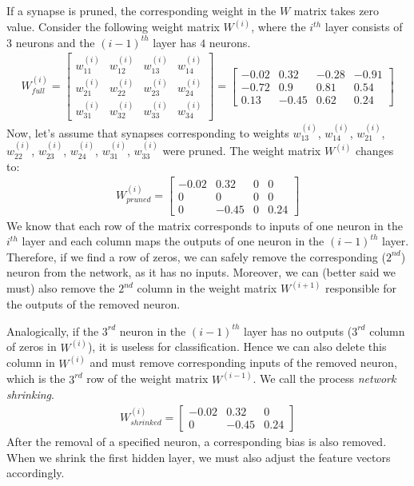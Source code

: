If a synapse is pruned, the corresponding weight in the $ W $ matrix takes zero value. Consider the following weight matrix $ W^{(i)} $, where the $ i^{th} $ layer consists of $ 3 $ neurons and the $ (i-1)^{th} $ layer has $ 4 $ neurons.
\begin{align*}
W_{full}^{(i)} = 
\begin{bmatrix}
    w_{11}^{(i)} & w_{12}^{(i)} & w_{13}^{(i)} & w_{14}^{(i)} \\
    w_{21}^{(i)} & w_{22}^{(i)} & w_{23}^{(i)} & w_{24}^{(i)} \\
    w_{31}^{(i)} & w_{32}^{(i)} & w_{33}^{(i)} & w_{34}^{(i)}
\end{bmatrix}
=
\begin{bmatrix}
    -0.02 & 0.32 & -0.28 & -0.91 \\
    -0.72 & 0.9 & 0.81 & 0.54 \\
    0.13 & -0.45 & 0.62 & 0.24
\end{bmatrix}
\end{align*}
Now, let's assume that synapses corresponding to weights $ w_{13}^{(i)} $, $ w_{14}^{(i)} $, $ w_{21}^{(i)} $, $ w_{22}^{(i)} $, $ w_{23}^{(i)} $, $ w_{24}^{(i)} $, $ w_{31}^{(i)} $, $ w_{33}^{(i)} $ were pruned. The weight matrix $ W^{(i)} $ changes to:
\begin{align*}
W_{pruned}^{(i)} = 
\begin{bmatrix}
    -0.02 & 0.32 & 0 & 0 \\
    0 & 0 & 0 & 0 \\
    0 & -0.45 & 0 & 0.24
\end{bmatrix}
\end{align*}
We know that each row of the matrix corresponds to inputs of one neuron in the $ i^{th} $ layer and each column maps the outputs of one neuron in the $ (i-1)^{th} $ layer. Therefore, if we find a row of zeros, we can safely remove the corresponding ($ 2^{nd} $) neuron from the network, as it has no inputs. Moreover, we can (better said we must) also remove the $ 2^{nd} $ column in the weight matrix $ W^{(i+1)} $ responsible for the outputs of the removed neuron.

Analogically, if the $ 3^{rd} $ neuron in the $ (i-1)^{th} $ layer has no outputs ($ 3^{rd} $ column of zeros in $ W^{(i)} $), it is useless for classification. Hence we can also delete this column in $ W^{(i)} $ and must remove corresponding inputs of the removed neuron, which is the $ 3^{rd} $ row of the weight matrix $ W^{(i-1)} $. We call the process \textit{network shrinking}.
\begin{align*}
W_{shrinked}^{(i)} = 
\begin{bmatrix}
    -0.02 & 0.32 & 0 \\
    0 & -0.45 & 0.24
\end{bmatrix}
\end{align*}
After the removal of a specified neuron, a corresponding bias is also removed. When we shrink the first hidden layer, we must also adjust the feature vectors accordingly.

